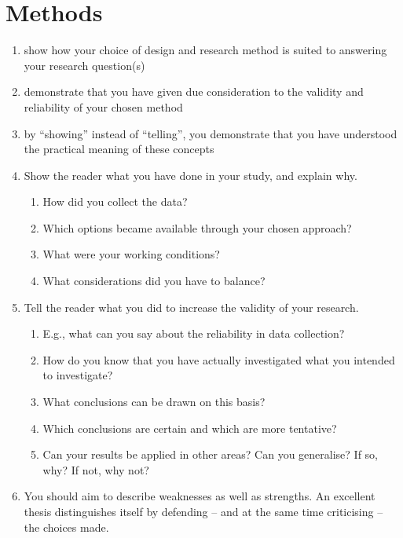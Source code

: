 
\section{Methods}
\label{sec:meth}
 
 \begin{enumerate}
     \item show how your choice of design and research method is suited to answering your research question(s)
     \item demonstrate that you have given due consideration to the validity and reliability of your chosen method
     \item by “showing” instead of “telling”, you demonstrate that you have understood the practical meaning of these concepts
     \item Show the reader what you have done in your study, and explain why. 
     \begin{enumerate}
         \item How did you collect the data? 
         \item Which options became available through your chosen approach?
         \item What were your working conditions? 
         \item What considerations did you have to balance?
     \end{enumerate}
    \item Tell the reader what you did to increase the validity of your research. 
    \begin{enumerate}
        \item E.g., what can you say about the reliability in data collection? 
        \item How do you know that you have actually investigated what you intended to investigate? 
        \item What conclusions can be drawn on this basis? 
        \item Which conclusions are certain and which are more tentative?
        \item Can your results be applied in other areas? Can you generalise? If so, why? If not, why not?
    \end{enumerate}
    \item You should aim to describe weaknesses as well as strengths. An excellent thesis distinguishes itself by defending – and at the same time criticising – the choices made.
 \end{enumerate}
 
